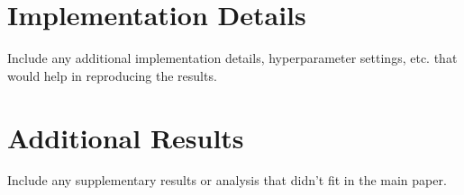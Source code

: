 \documentclass[12pt, twocolumn]{article}
\begin{document}
\section{Implementation Details}
Include any additional implementation details, hyperparameter settings, etc. that would help in reproducing the results.
\section{Additional Results}
Include any supplementary results or analysis that didn't fit in the main paper.
% 
\end{document}
